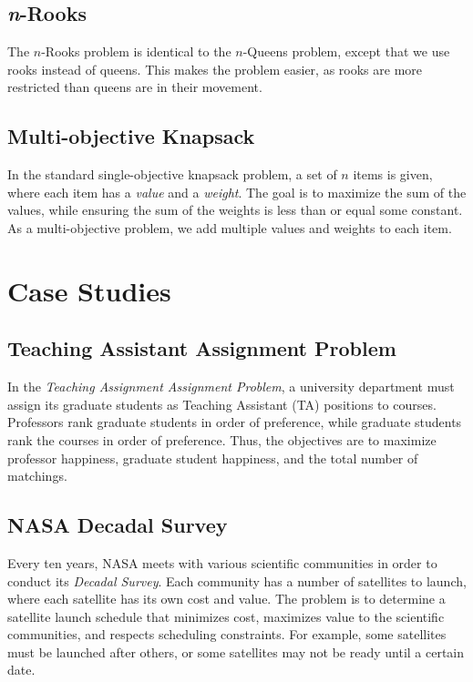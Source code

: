 \documentclass[11pt]{article}
\begin{document}
\subsection{\textit{n}-Rooks}

The $n$-Rooks problem is identical to the $n$-Queens problem, except
that we use rooks instead of queens. This makes the problem easier, as
rooks are more restricted than queens are in their movement.

\subsection{Multi-objective Knapsack}

In the standard single-objective knapsack problem, a set of $n$ items
is given, where each item has a \textit{value} and a \textit{weight}.
The goal is to maximize the sum of the values, while ensuring the sum
of the weights is less than or equal some constant. As a
multi-objective problem, we add multiple values and weights to each
item.

\section{Case Studies}

\subsection{Teaching Assistant Assignment Problem}

In the \textit{Teaching Assignment Assignment Problem}, a university
department must assign its graduate students as Teaching Assistant (TA)
positions to courses. Professors rank graduate students in order of
preference, while graduate students rank the courses in order of
preference. Thus, the objectives are to maximize professor happiness,
graduate student happiness, and the total number of matchings.

\subsection{NASA Decadal Survey}

Every ten years, NASA meets with various scientific communities in
order to conduct its \textit{Decadal Survey}. Each community has a
number of satellites to launch, where each satellite has its own cost
and value. The problem is to determine a satellite launch schedule that
minimizes cost, maximizes value to the scientific communities, and
respects scheduling constraints. For example, some satellites must be
launched after others, or some satellites may not be ready until a
certain date.
\end{document}
